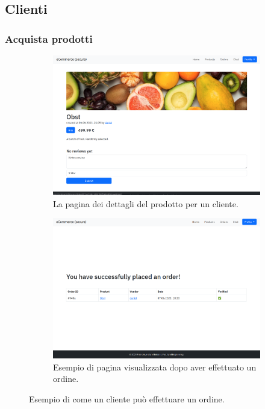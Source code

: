 \documentclass[conference,onecolumn,a4paper]{IEEEtran}
\begin{document}
\subsection{Clienti}

\subsubsection{Acquista prodotti}

\begin{figure}[H]
    \centering
    \begin{subfigure}[b]{0.4\linewidth}
        \includegraphics[width=\linewidth]{resources/product-customer.png}
        \caption{La pagina dei dettagli del prodotto per un cliente.}
    \end{subfigure}
    \begin{subfigure}[b]{0.4\linewidth}
        \includegraphics[width=\linewidth]{resources/order.png}
        \caption{Esempio di pagina visualizzata dopo aver effettuato un ordine.}
    \end{subfigure}
    \caption{Esempio di come un cliente può effettuare un ordine.}
\end{figure}
\end{document}
